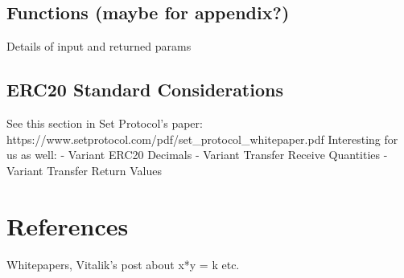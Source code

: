 \documentclass[11pt]{amsart}
\begin{document}
\subsection{Functions (maybe for appendix?)}
Details of input and returned params

\subsection{ERC20 Standard Considerations}
See this section in Set Protocol's paper: https://www.setprotocol.com/pdf/set\_protocol\_whitepaper.pdf
Interesting for us as well: 
- Variant ERC20 Decimals
- Variant Transfer Receive Quantities
- Variant Transfer Return Values


\section{References}
Whitepapers, Vitalik's post about x*y = k etc.
\end{document}

